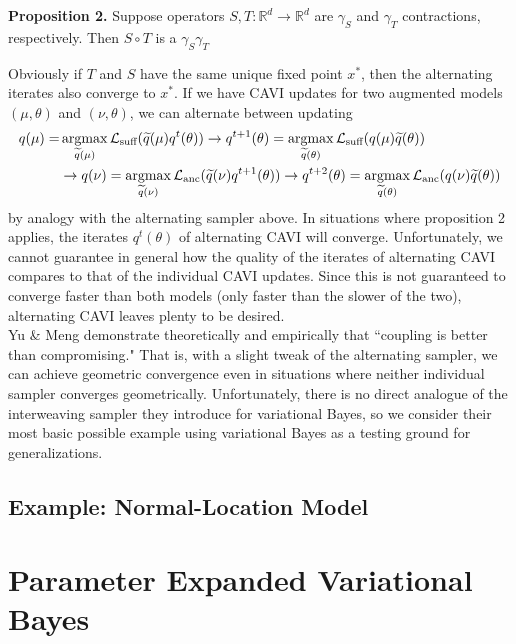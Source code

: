 \documentclass{article}
\begin{document}
{\bf Proposition 2.} Suppose operators $S,T:\mathbb R^d\to\mathbb R^d$ are $\gamma_S$ and $\gamma_T$ contractions, respectively. Then $S\circ T$ is a $\gamma_S\gamma_T$%

Obviously if $T$ and $S$ have the same unique fixed point $x^*$, then the alternating iterates also converge to $x^*$. If we have CAVI updates for two augmented models $(\mu,\theta)$ and $(\nu,\theta)$, we can alternate between updating 
\begin{align*}
q(\mu) = &\mathop{\mathrm{argmax}}_{\widetilde q(\mu)} \mathcal L_\text{suff}(\widetilde q(\mu) q^t(\theta)) 
\to q^{t+1}(\theta) = \mathop{\mathrm{argmax}}_{\widetilde q(\theta)} \mathcal L_\text{suff}(q(\mu) \widetilde q(\theta)) \\
&\to q(\nu) = \mathop{\mathrm{argmax}}_{\widetilde q(\nu)} \mathcal L_\text{anc}(\widetilde q(\nu) q^{t+1}(\theta)) 
\to q^{t+2}(\theta) = \mathop{\mathrm{argmax}}_{\widetilde q(\theta)} \mathcal L_\text{anc}(q(\nu) \widetilde q(\theta)) 
\end{align*}
by analogy with the alternating sampler above. In situations where proposition 2 applies, the iterates $q^t(\theta)$ of alternating CAVI will converge. Unfortunately, we cannot guarantee in general how the quality of the iterates of alternating CAVI compares to that of the individual CAVI updates. Since this is not guaranteed to converge faster than both models (only faster than the slower of the two), alternating CAVI leaves plenty to be desired. \\

Yu \& Meng \cite{Yu} demonstrate theoretically and empirically that ``coupling is better than compromising." That is, with a slight tweak of the alternating sampler, we can achieve geometric convergence even in situations where neither individual sampler converges geometrically. Unfortunately, there is no direct analogue of the interweaving sampler they introduce for variational Bayes, so we consider their most basic possible example using variational Bayes as a testing ground for generalizations.

\subsection{Example: Normal-Location Model} 

\newpage

\section{Parameter Expanded Variational Bayes}
\label{PXVB}
\end{document}

